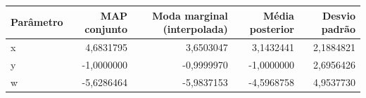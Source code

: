 \begin{tabular}{lrrrr}
\toprule
Parâmetro & MAP conjunto & Moda marginal (interpolada) & Média posterior & Desvio padrão \\
\midrule
x & 4,6831795 & 3,6503047 & 3,1432441 & 2,1884821 \\
y & -1,0000000 & -0,9999970 & -1,0000000 & 2,6956426 \\
w & -5,6286464 & -5,9837153 & -4,5968758 & 4,9537730 \\
\bottomrule
\end{tabular}

